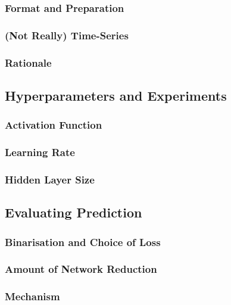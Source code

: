 \documentclass[runningheads]{llncs}
\begin{document}
\subsubsection {Format and Preparation}

\subsubsection {(Not Really) Time-Series}

\subsubsection {Rationale}

\subsection{Hyperparameters and Experiments}

\subsubsection{Activation Function}

\subsubsection{Learning Rate}

\subsubsection{Hidden Layer Size}

\subsection{Evaluating Prediction}

\subsubsection{Binarisation and Choice of Loss}

\subsubsection{Amount of Network Reduction}

\subsubsection{Mechanism} 
\end{document}
